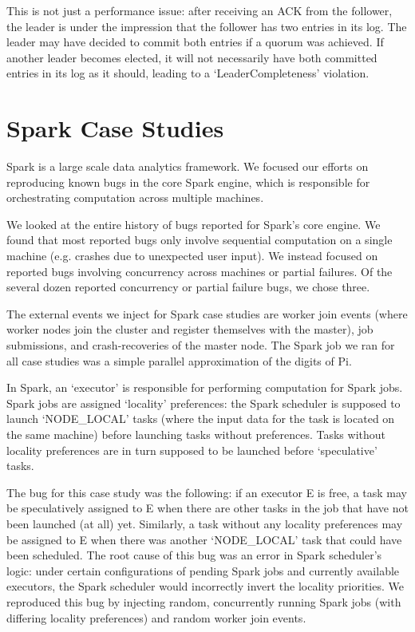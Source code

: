 This is not just a performance issue: after receiving an ACK from the follower, the leader is under the
 impression that the follower has two entries in its log.
 The leader may have decided to commit both entries if a quorum was achieved.
 If another leader becomes elected, it will not necessarily have both
 committed entries in its log as it should, leading to a `LeaderCompleteness'
 violation.


\section{Spark Case Studies}
\label{app:spark_case_studies}

Spark is a large scale data analytics framework. We focused our efforts on
reproducing known bugs in the core Spark engine, which is responsible for
orchestrating computation across multiple machines.

We looked at the entire history of bugs reported for Spark's core engine. We found that most reported bugs only involve sequential
computation on a single machine (e.g. crashes due to unexpected user input).
We instead focused on reported bugs involving concurrency across machines or
partial failures. Of the several dozen reported concurrency or partial failure
bugs, we chose three.

The external events we inject for Spark case studies are worker join events
(where worker nodes join the cluster and register themselves with the master),
job submissions, and crash-recoveries of the master node. The Spark job we ran
for all case studies was a simple parallel approximation of the digits of Pi.



 In Spark, an `executor' is
responsible for performing computation for Spark jobs. Spark jobs are assigned
`locality' preferences: the Spark scheduler is supposed to launch
`NODE\_LOCAL' tasks (where the input data for the task is located on the same
machine) before launching tasks without preferences. Tasks without locality
preferences are in turn
supposed to be launched before `speculative' tasks.

The bug for this case
study was the following: if an executor E is free, a task may be speculatively assigned to E when there are other tasks in the job
that have not been launched (at all) yet. Similarly, a task without any locality preferences may be
assigned to E when there was another `NODE\_LOCAL' task that could have been scheduled.
The root cause of this bug was an error in Spark scheduler's logic: under
certain configurations of pending Spark jobs and currently available
executors, the Spark scheduler would incorrectly invert the locality priorities.
We reproduced this bug by injecting random, concurrently running Spark jobs
(with differing locality preferences) and random worker join events.

